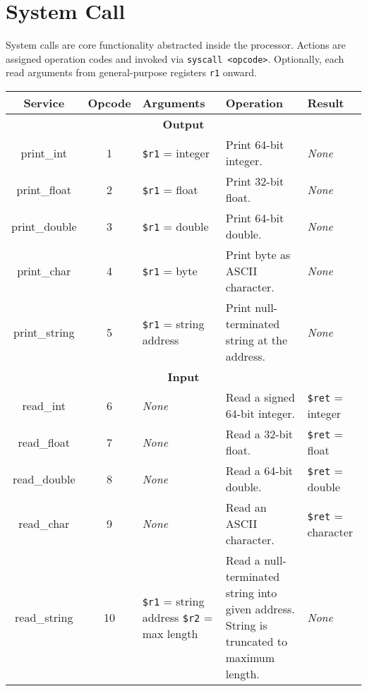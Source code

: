 \documentclass{article}
\begin{document}
\section{System Call}

System calls are core functionality abstracted inside the processor.
Actions are assigned operation codes and invoked via \texttt{syscall <opcode>}.
Optionally, each read arguments from general-purpose registers \texttt{r1} onward.

\bigskip
\begin{longtable}{|c|c|l|l|l|}
    \hline
    \textbf{Service} & \textbf{Opcode} & \textbf{Arguments} & \textbf{Operation} & \textbf{Result} \\
    \hline
    \multicolumn{5}{|c|}{\textbf{Output}} \\
    \hline
    print\_int & 1 & \texttt{\$r1} = integer & Print 64-bit integer. & \textit{None} \\
    \hline
    print\_float & 2 & \texttt{\$r1} = float & Print 32-bit float. & \textit{None} \\
    \hline
    print\_double & 3 & \texttt{\$r1} = double & Print 64-bit double. & \textit{None} \\
    \hline
    print\_char & 4 & \texttt{\$r1} = byte & Print byte as ASCII character. & \textit{None} \\
    \hline
    print\_string & 5 & \texttt{\$r1} = string address & Print null-terminated string at the address. & \textit{None} \\
    \hline \hline
    \multicolumn{5}{|c|}{\textbf{Input}} \\
    \hline
    read\_int & 6 & \textit{None} & Read a signed 64-bit integer. & \texttt{\$ret} = integer \\
    \hline
    read\_float & 7 & \textit{None} & Read a 32-bit float. & \texttt{\$ret} = float \\
    \hline
    read\_double & 8 & \textit{None} & Read a 64-bit double. & \texttt{\$ret} = double \\
    \hline
    read\_char & 9 & \textit{None} & Read an ASCII character. & \texttt{\$ret} = character \\
    \hline
    read\_string & 10 & \makecell[l]{\texttt{\$r1} = string address\\%
    \texttt{\$r2} = max length} & \makecell[l]{Read a null-terminated string into given address.\\%
    String is truncated to maximum length.} & \textit{None} \\
    \hline \hline

\end{longtable}
\end{document}
